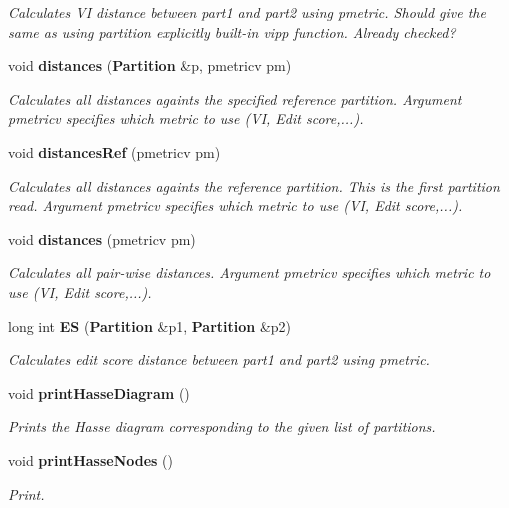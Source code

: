 \begin{CompactItemize}
\begin{CompactList}\small\item\em Calculates VI distance between part1 and part2 using pmetric. Should give the same as using partition explicitly built-in vipp function. Already checked? \item\end{CompactList}\item 
void {\bf distances} ({\bf Partition} \&p, pmetricv pm)\label{classPartitionStats_a13}

\begin{CompactList}\small\item\em Calculates all distances againts the specified reference partition. Argument pmetricv specifies which metric to use (VI, Edit score,...). \item\end{CompactList}\item 
void {\bf distances\-Ref} (pmetricv pm)\label{classPartitionStats_a14}

\begin{CompactList}\small\item\em Calculates all distances againts the reference partition. This is the first partition read. Argument pmetricv specifies which metric to use (VI, Edit score,...). \item\end{CompactList}\item 
void {\bf distances} (pmetricv pm)\label{classPartitionStats_a15}

\begin{CompactList}\small\item\em Calculates all pair-wise distances. Argument pmetricv specifies which metric to use (VI, Edit score,...). \item\end{CompactList}\item 
long int {\bf ES} ({\bf Partition} \&p1, {\bf Partition} \&p2)\label{classPartitionStats_a16}

\begin{CompactList}\small\item\em Calculates edit score distance between part1 and part2 using pmetric. \item\end{CompactList}\item 
void {\bf print\-Hasse\-Diagram} ()\label{classPartitionStats_a17}

\begin{CompactList}\small\item\em Prints the Hasse diagram corresponding to the given list of partitions. \item\end{CompactList}\item 
void {\bf print\-Hasse\-Nodes} ()\label{classPartitionStats_a18}

\begin{CompactList}\small\item\em Print. \item\end{CompactList}\end{CompactItemize}

